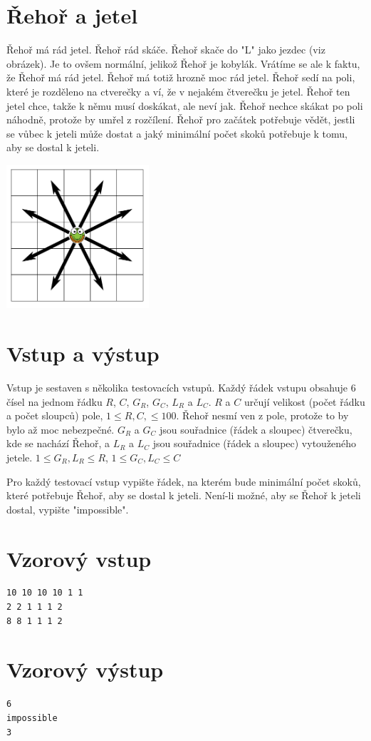 \documentclass{article}
\begin{document}
\section*{\Huge Řehoř a jetel}
Řehoř má rád jetel. Řehoř rád skáče. Řehoř skače do "L" jako jezdec (viz obrázek). Je to ovšem normální, jelikož Řehoř je kobylák. Vrátíme se ale k faktu, že Řehoř má rád jetel. Řehoř má totiž hrozně moc rád jetel. Řehoř sedí na poli, které je rozděleno na ctverečky a ví, že v nejakém čtverečku je jetel. Řehoř ten jetel chce, takže k němu musí doskákat, ale neví jak. Řehoř nechce skákat po poli náhodně, protože by umřel z rozčílení. Řehoř pro začátek potřebuje vědět, jestli se vůbec k jeteli může dostat a jaký minimální počet skoků potřebuje k tomu, aby se dostal k jeteli.

\begin{center}
\includegraphics[width = 200px]{problem-image1}
\end{center}

\section*{Vstup a výstup}
Vstup je sestaven s několika testovacích vstupů. Každý řádek vstupu obsahuje 6 čísel na jednom řádku $R$, $C$, $G_R$, $G_C$, $L_R$ a $L_C$. $R$ a $C$ určují velikost (počet řádku a počet sloupců) pole, $1 \leq R, C, \leq 100$. Řehoř nesmí ven z pole, protože to by bylo až moc nebezpečné. $G_R$ a $G_C$ jsou souřadnice (řádek a sloupec) čtverečku, kde se nachází Řehoř, a $L_R$ a $L_C$ jsou souřadnice (řádek a sloupec) vytouženého jetele. $1 \leq G_R, L_R \leq R$, $1 \leq G_C, L_C \leq C$

Pro každý testovací vstup vypište řádek, na kterém bude minimální počet skoků, které potřebuje Řehoř, aby se dostal k jeteli. Není-li možné, aby se Řehoř k jeteli dostal, vypište "impossible".

\section*{Vzorový vstup}
\begin{verbatim}
10 10 10 10 1 1
2 2 1 1 1 2
8 8 1 1 1 2
\end{verbatim}

\section*{Vzorový výstup}
\begin{verbatim}
6
impossible
3
\end{verbatim}
\end{document}
